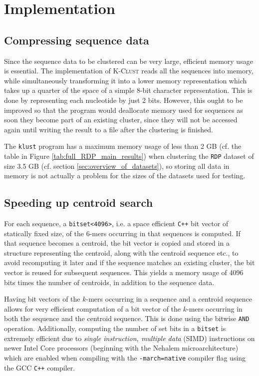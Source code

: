 \section{Implementation} \label{sec:implementation}

\subsection{Compressing sequence data}

Since the sequence data to be clustered can be very large, efficient memory
usage is essential. The implementation of \textsc{K-Clust} reads all the
sequences into memory, while simultaneously transforming it into a lower memory
representation which takes up a quarter of the space of a simple 8-bit
character representation. This is done by representing each nucleotide by just
2 bits. However, this ought to be improved so that the program would deallocate
memory used for sequences as soon they become part of an existing cluster,
since they will not be accessed again until writing the result to a file after
the clustering is finished.

The \texttt{klust} program has a maximum memory usage of less than 2 GB (cf.
the table in Figure \ref{tab:full_RDP_main_results}) when clustering the
\texttt{RDP} dataset of size 3.5 GB (cf. section
\ref{sec:overview_of_datasets}), so storing all data in memory is not actually
a problem for the sizes of the datasets used for testing.


\subsection{Speeding up centroid search}

For each sequence, a \verb|bitset<4096>|, i.e. a space efficient \texttt{C++}
bit vector of statically fixed size, of the $6$-mers occurring in that
sequences is computed. If that sequence becomes a centroid, the bit vector is
copied and stored in a structure representing the centroid, along with the
centroid sequence etc., to avoid recomputing it later and if the sequence
matches an existing cluster, the bit vector is reused for subsequent sequences.
This yields a memory usage of 4096 bits times the number of centroids, in
addition to the sequence data.

Having bit vectors of the $k$-mers occurring in a sequence and a centroid
sequence allows for very efficient computation of a bit vector of the $k$-mers
occurring in both the sequence and the centroid sequence. This is done using
the bitwise \verb|AND| operation. Additionally, computing the number of set
bits in a \verb|bitset| is extremely efficient due to \emph{single instruction,
multiple data} (SIMD) instructions on newer Intel Core processors (beginning
with the Nehalem microarchitecture) which are enabled when compiling with the
\verb|-march=native| compiler flag using the GCC \texttt{C++} compiler.


